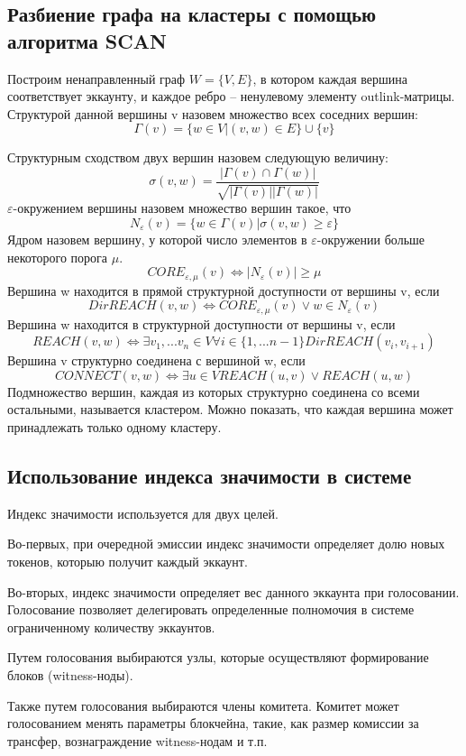 \documentclass[a4paper,12pt]{article}
\begin{document}
\subsection{Разбиение графа на кластеры с помощью алгоритма SCAN}
Построим ненаправленный граф $W = \{V, E\}$, в котором каждая вершина соответствует эккаунту, и каждое ребро – ненулевому элементу outlink-матрицы.
Структурой данной вершины v назовем множество всех соседних вершин:
$$
\Gamma(v)=\{w \in V|(v,w) \in E\} \cup \{v\}
$$

Структурным сходством двух вершин назовем следующую величину:
$$
\sigma(v,w)=\frac{ |\Gamma(v) \cap \Gamma(w)|}{\sqrt{|\Gamma(v)||\Gamma(w)|}}
$$
$\varepsilon$-окружением вершины назовем множество вершин такое, что
$$
N_{\varepsilon}(v) = \{ w \in \Gamma(v) | \sigma(v,w) \ge \varepsilon \}
$$
Ядром назовем вершину, у которой число элементов в $\varepsilon$-окружении больше некоторого порога $\mu$.
$$
CORE_{\varepsilon,\mu}(v) \Leftrightarrow |N_{\varepsilon} (v)| \ge \mu
$$
Вершина w находится в прямой структурной доступности от вершины v, если
$$
DirREACH(v,w) \Leftrightarrow CORE_{\varepsilon,\mu}(v) \vee w \in N_{\varepsilon}(v)
$$
Вершина w находится в структурной доступности от вершины v, если
$$
REACH(v,w) \Leftrightarrow \exists v_1,...v_n \in V \forall i \in \{1,...n-1\}DirREACH(v_i,v_{i+1})
$$
Вершина v структурно соединена с вершиной w, если
$$
CONNECT(v,w) \Leftrightarrow \exists u \in V REACH(u,v) \vee REACH(u,w)
$$
Подмножество вершин, каждая из которых структурно соединена со всеми остальными, называется кластером. Можно показать, что каждая вершина может принадлежать только одному кластеру.

\subsection{Использование индекса значимости в системе}
Индекс значимости используется для двух целей. 

Во-первых, при очередной эмиссии индекс значимости определяет долю новых токенов, которыю получит каждый эккаунт.

Во-вторых, индекс значимости определяет вес данного эккаунта при голосовании. Голосование позволяет делегировать определенные полномочия в системе ограниченному количеству эккаунтов.

Путем голосования выбираются узлы, которые осуществляют формирование блоков (witness-ноды). 

Также путем голосования выбираются члены комитета. Комитет может голосованием менять параметры блокчейна, такие, как размер комиссии за трансфер, вознаграждение witness-нодам и т.п.
\end{document}
